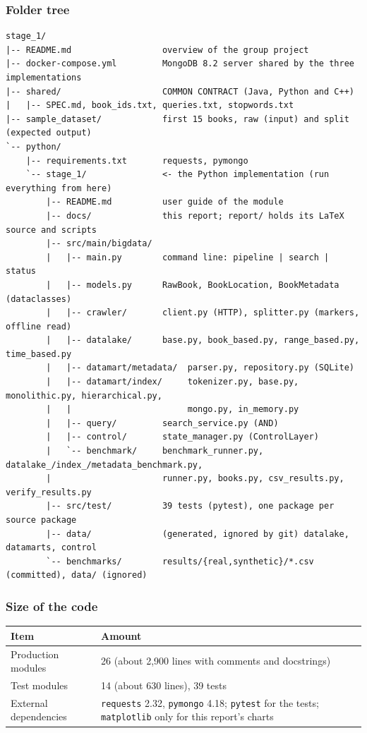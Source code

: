 \documentclass[11pt,a4paper]{article}
\newcommand{\code}[1]{\texttt{#1}}
\begin{document}
\subsubsection{Folder tree}
\begin{lstlisting}[style=shell]
stage_1/
|-- README.md                  overview of the group project
|-- docker-compose.yml         MongoDB 8.2 server shared by the three implementations
|-- shared/                    COMMON CONTRACT (Java, Python and C++)
|   |-- SPEC.md, book_ids.txt, queries.txt, stopwords.txt
|-- sample_dataset/            first 15 books, raw (input) and split (expected output)
`-- python/
    |-- requirements.txt       requests, pymongo
    `-- stage_1/               <- the Python implementation (run everything from here)
        |-- README.md          user guide of the module
        |-- docs/              this report; report/ holds its LaTeX source and scripts
        |-- src/main/bigdata/
        |   |-- main.py        command line: pipeline | search | status
        |   |-- models.py      RawBook, BookLocation, BookMetadata (dataclasses)
        |   |-- crawler/       client.py (HTTP), splitter.py (markers, offline read)
        |   |-- datalake/      base.py, book_based.py, range_based.py, time_based.py
        |   |-- datamart/metadata/  parser.py, repository.py (SQLite)
        |   |-- datamart/index/     tokenizer.py, base.py, monolithic.py, hierarchical.py,
        |   |                       mongo.py, in_memory.py
        |   |-- query/         search_service.py (AND)
        |   |-- control/       state_manager.py (ControlLayer)
        |   `-- benchmark/     benchmark_runner.py, datalake_/index_/metadata_benchmark.py,
        |                      runner.py, books.py, csv_results.py, verify_results.py
        |-- src/test/          39 tests (pytest), one package per source package
        |-- data/              (generated, ignored by git) datalake, datamarts, control
        `-- benchmarks/        results/{real,synthetic}/*.csv (committed), data/ (ignored)
\end{lstlisting}

\subsubsection{Size of the code}
\begin{table}[H]
\centering\small
\begin{tabularx}{\linewidth}{@{}l Y@{}}
\toprule
Item & Amount \\
\midrule
Production modules & 26 (about 2,900 lines with comments and docstrings) \\
Test modules & 14 (about 630 lines), 39 tests \\
External dependencies & \code{requests} 2.32, \code{pymongo} 4.18; \code{pytest} for the tests; \code{matplotlib} only for this report's charts \\
\bottomrule
\end{tabularx}
\end{table}
\end{document}
